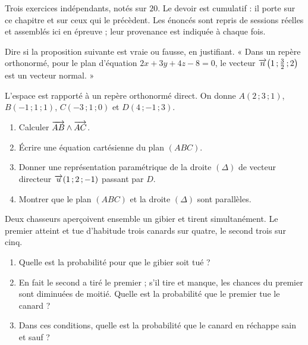\begin{devoir}[2 heures]
Trois exercices indépendants, notés sur $20$. Le devoir est cumulatif : il porte sur ce chapitre et sur ceux qui le précèdent. Les énoncés sont repris de sessions réelles et assemblés ici en épreuve ; leur provenance est indiquée à chaque fois.

Dire si la proposition suivante est vraie ou fausse, en justifiant.
« Dans un repère orthonormé, pour le plan d'équation $2x+3y+4z-8 = 0$, le
vecteur $\overrightarrow{n}\!\left(1\,;\frac32\,;2\right)$ est un vecteur normal. »

L'espace est rapporté à un repère orthonormé direct. On donne
$A(2\,;3\,;1)$, $B(-1\,;1\,;1)$, $C(-3\,;1\,;0)$ et $D(4\,;-1\,;3)$.
\begin{enumerate}[label=\textbf{\arabic*)}, leftmargin=*, itemsep=0.15em]
  \item Calculer $\overrightarrow{AB} \wedge \overrightarrow{AC}$.
  \item Écrire une équation cartésienne du plan $(ABC)$.
  \item Donner une représentation paramétrique de la droite $(\Delta)$ de
        vecteur directeur $\overrightarrow{u}(1\,;2\,;-1)$ passant par $D$.
  \item Montrer que le plan $(ABC)$ et la droite $(\Delta)$ sont parallèles.
\end{enumerate}

Deux chasseurs aperçoivent ensemble un gibier et tirent simultanément. Le
premier atteint et tue d'habitude trois canards sur quatre, le second trois
sur cinq.
\begin{enumerate}[label=\textbf{\alph*)}, leftmargin=*, itemsep=0.15em]
  \item Quelle est la probabilité pour que le gibier soit tué ?
  \item En fait le second a tiré le premier ; s'il tire et manque, les chances
        du premier sont diminuées de moitié. Quelle est la probabilité que le
        premier tue le canard ?
  \item Dans ces conditions, quelle est la probabilité que le canard en
        réchappe sain et sauf ?
\end{enumerate}

\end{devoir}

